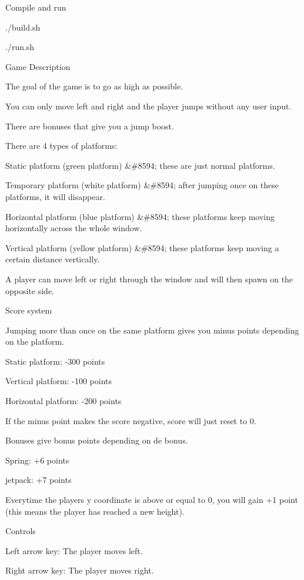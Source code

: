 Compile and run
\begin{DoxyItemize}
\item ./build.sh
\item ./run.sh
\end{DoxyItemize}

Game Description
\begin{DoxyItemize}
\item The goal of the game is to go as high as possible.
\item You can only move left and right and the player jumps without any user input.
\item There are bonuses that give you a jump boost.
\item There are 4 types of platforms\+:
\begin{DoxyItemize}
\item Static platform (green platform) \&\#8594; these are just normal platforms.
\item Temporary platform (white platform) \&\#8594; after jumping once on these platforms, it will disappear.
\item Horizontal platform (blue platform) \&\#8594; these platforms keep moving horizontally across the whole window.
\item Vertical platform (yellow platform) \&\#8594; these platforms keep moving a certain distance vertically.
\end{DoxyItemize}
\item A player can move left or right through the window and will then spawn on the opposite side.
\end{DoxyItemize}

Score system
\begin{DoxyItemize}
\item Jumping more than once on the same platform gives you minus points depending on the platform.
\begin{DoxyItemize}
\item Static platform\+: -\/300 points
\item Vertical platform\+: -\/100 points
\item Horizontal platform\+: -\/200 points
\end{DoxyItemize}
\item If the minus point makes the score negative, score will just reset to 0.
\item Bonuses give bonus points depending on de bonus.
\begin{DoxyItemize}
\item Spring\+: +6 points
\item jetpack\+: +7 points
\end{DoxyItemize}
\item Everytime the player\textquotesingle{}s y coordinate is above or equal to 0, you will gain +1 point (this means the player has reached a new height).
\end{DoxyItemize}

Controls
\begin{DoxyItemize}
\item Left arrow key\+: The player moves left.
\item Right arrow key\+: The player moves right. 
\end{DoxyItemize}